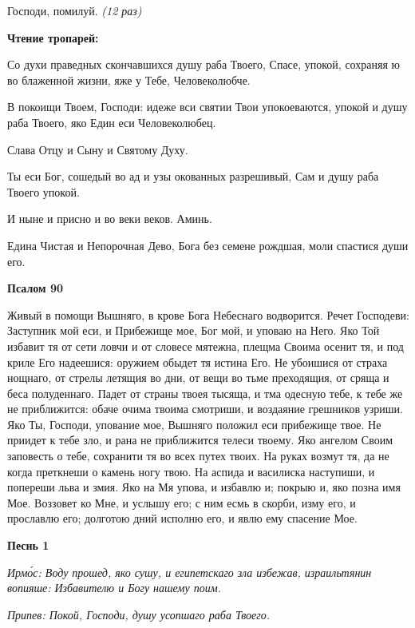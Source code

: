    Господи, помилуй. \itshape (12 раз)\normalfont{}



 

\bfseries Чтение тропарей:\normalfont{}


   Со духи праведных скончавшихся душу раба Твоего, Спасе, упокой,
сохраняя ю во блаженной жизни, яже у Тебе, Человеколюбче.


   В покоищи Твоем, Господи: идеже вси святии Твои упокоеваются, упокой
и душу раба Твоего, яко Един еси Человеколюбец.


   Слава Отцу и Сыну и Святому Духу.


   Ты еси Бог, сошедый во ад и узы окованных разрешивый, Сам и душу
раба Твоего упокой.


   И ныне и присно и во веки веков. Аминь.


   Едина Чистая и Непорочная Дево, Бога без семене рождшая, моли
спастися души его.



 

\bfseries Псалом 90\normalfont{}


   Живый в помощи Вышняго, в крове Бога Небеснаго водворится.
Речет Господеви: Заступник мой еси, и Прибежище мое, Бог мой,
и уповаю на Него. Яко Той избавит тя от сети ловчи и от словесе
мятежна, плещма Своима осенит тя, и под криле Его надеешися:
оружием обыдет тя истина Его. Не убоишися от страха нощнаго, от
стрелы летящия во дни, от вещи во тьме преходящия, от сряща и беса
полуденнаго. Падет от страны твоея тысяща, и тма одесную тебе, к
тебе же не приближится: обаче очима твоима смотриши, и воздаяние
грешников узриши. Яко Ты, Господи, упование мое, Вышняго положил еси
прибежище твое. Не приидет к тебе зло, и рана не приближится телеси
твоему. Яко ангелом Своим заповесть о тебе, сохранити тя во всех
путех твоих. На руках возмут тя, да не когда преткнеши о камень
ногу твою. На аспида и василиска наступиши, и попереши льва и
змия. Яко на Мя упова, и избавлю и; покрыю и, яко позна имя Мое.
Воззовет ко Мне, и услышу его; с ним есмь в скорби, изму его, и
прославлю его; долготою дний исполню его, и явлю ему спасение
Мое.



 

\bfseries Песнь 1\normalfont{}


 \itshape Ирмо́с:\normalfont{} Воду прошед, яко сушу, и египетскаго зла избежав, израильтянин
вопияше: Избавителю и Богу нашему поим.


 \itshape Припев:\normalfont{} Покой, Господи, душу усопшаго раба Твоего.


